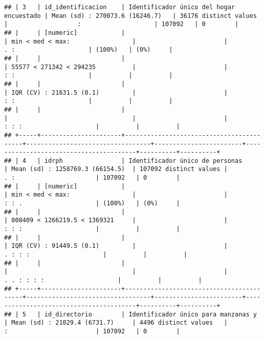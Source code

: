 \documentclass[]{article}
\begin{document}
\begin{verbatim}
## | 3   | id_identificacion    | Identificador único del hogar encuestado | Mean (sd) : 270073.6 (16246.7)   | 36176 distinct values  |                   :                    | 107092   | 0        |
## |     | [numeric]            |                                          | min < med < max:                 |                        |                 . :                    | (100%)   | (0%)     |
## |     |                      |                                          | 55577 < 271342 < 294235          |                        |                 : :                    |          |          |
## |     |                      |                                          | IQR (CV) : 21631.5 (0.1)         |                        |                 : :                    |          |          |
## |     |                      |                                          |                                  |                        |               : : :                    |          |          |
## +-----+----------------------+------------------------------------------+----------------------------------+------------------------+----------------------------------------+----------+----------+
## | 4   | idrph                | Identificador único de personas          | Mean (sd) : 1258769.3 (66154.5)  | 107092 distinct values |               . :                      | 107092   | 0        |
## |     | [numeric]            |                                          | min < med < max:                 |                        |               : : .                    | (100%)   | (0%)     |
## |     |                      |                                          | 808409 < 1266219.5 < 1369321     |                        |               : : :                    |          |          |
## |     |                      |                                          | IQR (CV) : 91449.5 (0.1)         |                        |             . : : :                    |          |          |
## |     |                      |                                          |                                  |                        |         . . : : : :                    |          |          |
## +-----+----------------------+------------------------------------------+----------------------------------+------------------------+----------------------------------------+----------+----------+
## | 5   | id_directorio        | Identificador único para manzanas y      | Mean (sd) : 21029.4 (6731.7)     | 4496 distinct values   |               :                        | 107092   | 0        |

\end{verbatim}
\end{document}
